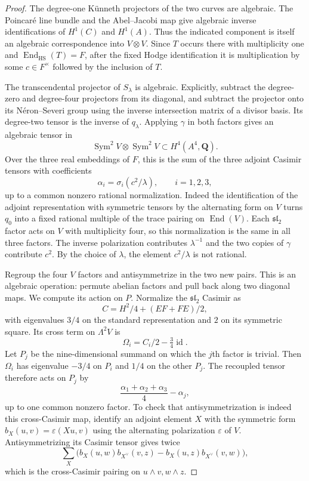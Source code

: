 \documentclass[11pt]{article}
\theoremstyle{definition}
\theoremstyle{remark}
\begin{document}
\begin{proof}
The degree-one K\"unneth projectors of the two curves are algebraic.
The Poincar\'e line bundle and the Abel--Jacobi map give algebraic
inverse identifications of $H^1(C)$ and $H^1(A)$.  Thus the indicated
component is itself an algebraic correspondence into $V\otimes V$.
Since $T$ occurs there with multiplicity one and
$\operatorname{End}_{\mathrm{HS}}(T)=F$, after the fixed Hodge
identification it is multiplication by some $c\in F^\times$ followed
by the inclusion of $T$.

The transcendental projector of $S_\lambda$ is algebraic.  Explicitly,
subtract the degree-zero and degree-four projectors from its diagonal,
and subtract the projector onto its N\'eron--Severi group using the
inverse intersection matrix of a divisor basis.  Its degree-two tensor
is the inverse of $q_\lambda$.  Applying $\gamma$ in both factors gives
an algebraic tensor in
\[
 \operatorname{Sym}^2V\otimes\operatorname{Sym}^2V
        \subset H^4(A^4,\mathbf Q).
\]
Over the three real embeddings of $F$, this is the sum of the three
adjoint Casimir tensors with coefficients
\begin{equation}
 \alpha_i=\sigma_i(c^2/\lambda),\qquad i=1,2,3,
 \label{eq:mumford-casimir-coeff}
\end{equation}
up to a common nonzero rational normalization. Indeed the identification of the adjoint representation with symmetric tensors by the alternating form on $V$ turns $q_0$ into a fixed rational multiple of the trace pairing on $\operatorname{End}(V)$. Each $\mathfrak{sl}_2$ factor acts on $V$ with multiplicity four, so this normalization is the same in all three factors. The inverse polarization
contributes $\lambda^{-1}$ and the two copies of $\gamma$ contribute
$c^2$.  By the choice of $\lambda$, the element $c^2/\lambda$ is not
rational.

Regroup the four $V$ factors and antisymmetrize in the two new pairs.
This is an algebraic operation: permute abelian factors and pull back
along two diagonal maps.  We compute its action on $P$.  Normalize the
$\mathfrak{sl}_2$ Casimir as
\[
 C=H^2/4+(EF+FE)/2,
\]
with eigenvalues $3/4$ on the standard representation and $2$ on its
symmetric square.  Its cross term on $\Lambda^2V$ is
\[
 \Omega_i=C_i/2-\tfrac34\operatorname{id}.
\]
Let $P_j$ be the nine-dimensional summand on which the $j$th factor is
trivial.  Then $\Omega_i$ has eigenvalue $-3/4$ on $P_i$ and $1/4$ on
the other $P_j$.  The recoupled tensor therefore acts on $P_j$ by
\begin{equation}
 \frac{\alpha_1+\alpha_2+\alpha_3}{4}-\alpha_j,
 \label{eq:mumford-casimir-eigen}
\end{equation}
up to one common nonzero factor.  To check that antisymmetrization is
indeed this cross-Casimir map, identify an adjoint element $X$ with the
symmetric form $b_X(u,v)=\varepsilon(Xu,v)$ using the alternating
polarization $\varepsilon$ of $V$.  Antisymmetrizing its Casimir tensor
gives twice
\[
 \sum_X\bigl(b_X(u,w)b_{X^\vee}(v,z)
             -b_X(u,z)b_{X^\vee}(v,w)\bigr),
\]
which is the cross-Casimir pairing on $u\wedge v,w\wedge z$.


\end{proof}
\end{document}
